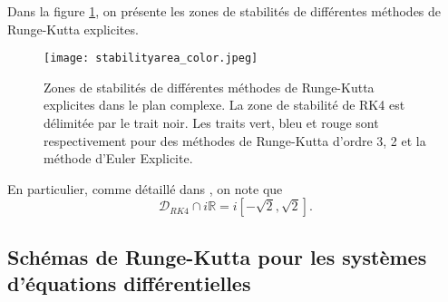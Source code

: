 Dans la figure \ref{fig:stab_area}, on présente les zones de stabilités de différentes méthodes de Runge-Kutta explicites.
\begin{figure}[htbp]
\begin{center}
\texttt{[image: stabilityarea\_color.jpeg]}
\end{center}
\caption{Zones de stabilités de différentes méthodes de Runge-Kutta explicites dans le plan complexe. La zone de stabilité de RK4 est délimitée par le trait noir. Les traits vert, bleu et rouge sont respectivement pour des méthodes de Runge-Kutta d'ordre 3, 2 et la méthode d'Euler Explicite.}
\label{fig:stab_area}
\end{figure}
En particulier, comme détaillé dans \cite{Hundsdorfer2013}, on note que
\begin{equation}
\mathcal{D}_{RK4} \cap i \mathbb{R} = i \left[-\sqrt{2},\sqrt{2}\right].
\end{equation}





\subsection{Schémas de Runge-Kutta pour les systèmes d'équations différentielles}

